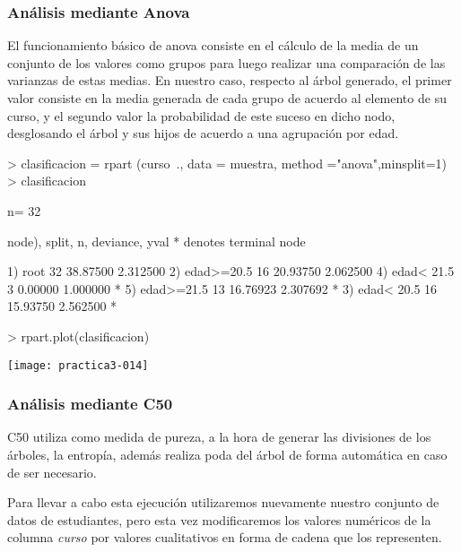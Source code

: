\documentclass[a4paper]{article}
\begin{document}
\subsubsection{Análisis mediante Anova}
El funcionamiento básico de anova consiste en el cálculo de la media de un conjunto de los valores como grupos para luego realizar una comparación de las varianzas de estas medias. En nuestro caso, respecto al árbol generado, el primer valor consiste en la media generada de cada grupo de acuerdo al elemento de su curso, y el segundo valor la probabilidad de este suceso en dicho nodo, desglosando el árbol y sus hijos de acuerdo a una agrupación por edad.
\begin{Schunk}
\begin{Sinput}
> clasificacion = rpart (curso~., data = muestra, method ="anova",minsplit=1)
> clasificacion
\end{Sinput}
\begin{Soutput}
n= 32 

node), split, n, deviance, yval
      * denotes terminal node

1) root 32 38.87500 2.312500  
  2) edad>=20.5 16 20.93750 2.062500  
    4) edad< 21.5 3  0.00000 1.000000 *
    5) edad>=21.5 13 16.76923 2.307692 *
  3) edad< 20.5 16 15.93750 2.562500 *
\end{Soutput}
\begin{Sinput}
> rpart.plot(clasificacion)
\end{Sinput}
\end{Schunk}
\texttt{[image: practica3-014]}

\subsubsection{Análisis mediante C50}
C50 utiliza como medida de pureza, a la hora de generar las divisiones de los árboles, la entropía, además realiza poda del árbol de forma automática en caso de ser necesario.

Para llevar a cabo esta ejecución utilizaremos nuevamente nuestro conjunto de datos de estudiantes, pero esta vez modificaremos los valores numéricos de la columna \textit{curso} por valores cualitativos en forma de cadena que los representen.
\begin{Schunk}
\end{Schunk}
\end{document}

